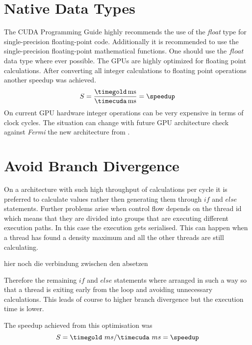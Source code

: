 \section{Native Data Types}
The \gls{CUDA} Programming Guide \citep{citeulike:3325943} highly recommends the
use of the \emph{float} type for single-precision floating-point code.
Additionally it is recommended to use the single-precision floating-point
mathematical functions. One should use the $float$ data type where ever
possible. The \glspl{GPU} are highly optimized for floating point calculations.
After converting all integer calculations to floating point operations another
speedup was achieved.
\fpDiv{\speedup}{\timegold}{\timecuda}
\begin{equation*}\label{eq:speedup5}
	S = \frac{\unit[\timegold]{ms}}{\unit[\timecuda]{ms}} = \speedup
\end{equation*}
On current \gls{GPU} hardware integer operations can be very expensive in terms
of clock cycles. The situation can change with future \gls{GPU} architecture check
against \emph{Fermi} the new architecture from {} 
{}.



\section{Avoid Branch Divergence} %
\label{sec:avoid_branch_divergence}
On a architecture with such high throughput of calculations per cycle it is
preferred to calculate values rather then generating them through $if$ and
$else$ statements. Further problems arise when control flow depends on the
thread id which means that they are divided into groups that are executing
different execution paths. In this case the execution gets serialised. This can
happen when a thread has found a density maximum and all the other threads are
still calculating.  

{\color{red} hier noch die verbindung zwischen den absetzen}

Therefore the remaining $if$ and $else$ statements where arranged in such a way
so that a thread is exiting early from the loop and avoiding unnecessary
calculations. This leads of course to higher branch divergence but the execution
time is lower. 

The speedup achieved from this optimisation was
\fpDiv{\speedup}{\timegold}{\timecuda}
\begin{equation*}\label{eq:speedup6}
	S = \timegold\ ms/\timecuda\ ms = \speedup
\end{equation*}



